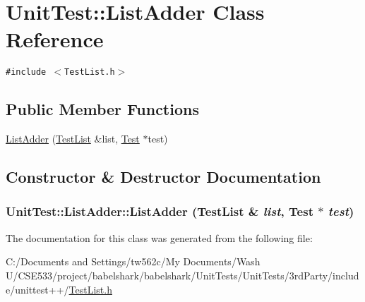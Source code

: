 \hypertarget{class_unit_test_1_1_list_adder}{
\section{UnitTest::ListAdder Class Reference}
\label{class_unit_test_1_1_list_adder}
}
{\tt \#include $<$TestList.h$>$}

\subsection*{Public Member Functions}
\begin{CompactItemize}
\item 
\hyperlink{class_unit_test_1_1_list_adder_e63020bfcaf6810089821af0f5cedc9a}{ListAdder} (\hyperlink{class_unit_test_1_1_test_list}{TestList} \&list, \hyperlink{class_unit_test_1_1_test}{Test} $\ast$test)
\end{CompactItemize}


\subsection{Constructor \& Destructor Documentation}
\hypertarget{class_unit_test_1_1_list_adder_e63020bfcaf6810089821af0f5cedc9a}{
\subsubsection[{ListAdder}]{\setlength{\rightskip}{0pt plus 5cm}UnitTest::ListAdder::ListAdder ({\bf TestList} \& {\em list}, \/  {\bf Test} $\ast$ {\em test})}}
\label{class_unit_test_1_1_list_adder_e63020bfcaf6810089821af0f5cedc9a}




The documentation for this class was generated from the following file:\begin{CompactItemize}
\item 
C:/Documents and Settings/tw562c/My Documents/Wash U/CSE533/project/babelshark/babelshark/UnitTests/UnitTests/3rdParty/include/unittest++/\hyperlink{_test_list_8h}{TestList.h}\end{CompactItemize}
